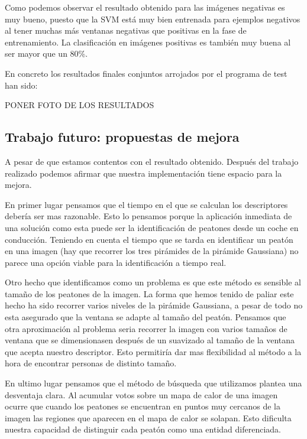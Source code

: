 \documentclass[a4paper,12pt]{article}
\begin{document}
Como podemos observar el resultado obtenido para las imágenes negativas es muy bueno, puesto que la SVM está muy bien entrenada para ejemplos negativos al tener muchas más ventanas negativas que positivas en la fase de entrenamiento. La clasificación en imágenes positivas es también muy buena al ser mayor que un 80\%.

En concreto los resultados finales conjuntos arrojados por el programa de test han sido:

PONER FOTO DE LOS RESULTADOS




\subsection{Trabajo futuro: propuestas de mejora}

A pesar de que estamos contentos con el resultado obtenido. Después del trabajo realizado podemos afirmar que nuestra implementación tiene espacio para la mejora.

En primer lugar pensamos que el tiempo en el que se calculan los descriptores debería ser mas razonable. Esto lo pensamos porque la aplicación inmediata de una solución como esta puede ser la identificación de peatones desde un coche en conducción. Teniendo en cuenta el tiempo que se tarda en identificar un peatón en una imagen (hay que recorrer los tres pirámides de la pirámide Gaussiana) no parece una opción viable para la identificación a tiempo real.

Otro hecho que identificamos como un problema es que este método es sensible al tamaño de los peatones de la imagen. La forma que hemos tenido de paliar este hecho ha sido recorrer varios niveles de la pirámide Gaussiana, a pesar de todo no esta asegurado que la ventana se adapte al tamaño del peatón. Pensamos que otra aproximación al problema seria recorrer la imagen con varios tamaños de ventana que se dimensionasen después de un suavizado al tamaño de la ventana que acepta nuestro descriptor. Esto permitiría dar mas flexibilidad al método a la hora de encontrar personas de distinto tamaño.

En ultimo lugar pensamos que el método de búsqueda que utilizamos plantea una desventaja clara. Al acumular votos sobre un mapa de calor de una imagen ocurre que cuando los peatones se encuentran en puntos muy cercanos de la imagen las regiones que aparecen en el mapa de calor se solapan. Esto dificulta nuestra capacidad de distinguir cada peatón como una entidad diferenciada.

\normalsize


%
%
\end{document}
